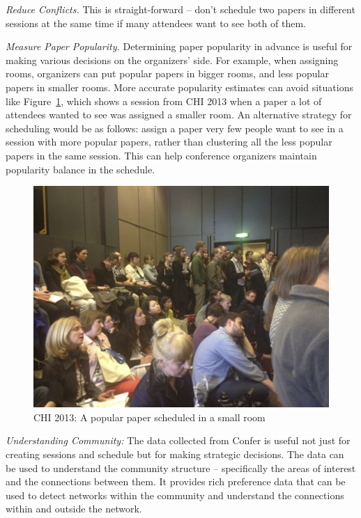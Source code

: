 \documentclass{sigchi}
\begin{document}
\emph{Reduce Conflicts.} This is straight-forward -- don't schedule two papers in different sessions at the same time if many attendees want to see both of them.

\emph{Measure Paper Popularity.} Determining paper popularity in advance is useful for making various decisions on the organizers' side. For example, when assigning rooms, organizers can put popular papers in bigger rooms, and less popular papers in smaller rooms. More accurate popularity estimates can avoid situations like Figure~\ref{crowded-room}, which shows a session from CHI 2013 when a paper a lot of attendees wanted to see was assigned a smaller room. An alternative strategy for scheduling would be as follows: assign a paper very few people want to see in a session with more popular papers, rather than clustering all the less popular papers in the same session. This can help conference organizers maintain popularity balance in the schedule.

\begin{figure}[!h]
\centering
\includegraphics[width=0.95\columnwidth]{crowded-room.png}
\caption{CHI 2013: A popular paper scheduled in a small room}
\label{crowded-room}
\end{figure}

\emph{Understanding Community:} The data collected from Confer is useful not just for creating sessions and schedule but for making strategic decisions. The data can be used to understand the community structure -- specifically the areas of interest and the connections between them. It provides rich preference data that can be used to detect networks within the community and understand the connections within and outside the network.
\end{document}
